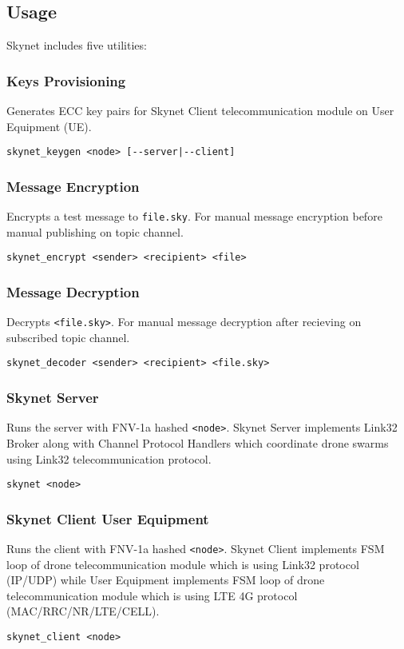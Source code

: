 \documentclass{article}
\begin{document}
\newpage
\subsection{Usage}
Skynet includes five utilities:

\subsubsection*{Keys Provisioning}
Generates ECC key pairs for Skynet Client telecommunication module on User Equipment (UE).
\begin{lstlisting}
skynet_keygen <node> [--server|--client]
\end{lstlisting}

\subsubsection*{Message Encryption}
Encrypts a test message to \texttt{file.sky}.
For manual message encryption before manual publishing on topic channel.
\begin{lstlisting}
skynet_encrypt <sender> <recipient> <file>
\end{lstlisting}

\subsubsection*{Message Decryption}
Decrypts \texttt{<file.sky>}.
For manual message decryption after recieving on subscribed topic channel.
\begin{lstlisting}
skynet_decoder <sender> <recipient> <file.sky>
\end{lstlisting}

\subsubsection*{Skynet Server}
Runs the server with FNV-1a hashed \texttt{<node>}.
Skynet Server implements Link32 Broker along with Channel Protocol Handlers
which coordinate drone swarms using Link32 telecommunication protocol.
\begin{lstlisting}
skynet <node>
\end{lstlisting}

\subsubsection*{Skynet Client User Equipment}
Runs the client with FNV-1a hashed \texttt{<node>}.
Skynet Client implements FSM loop of drone telecommunication module which is using Link32 protocol (IP/UDP)
while User Equipment implements FSM loop of drone telecommunication module which is using LTE 4G protocol (MAC/RRC/NR/LTE/CELL).
\begin{lstlisting}
skynet_client <node>
\end{lstlisting}
\end{document}
